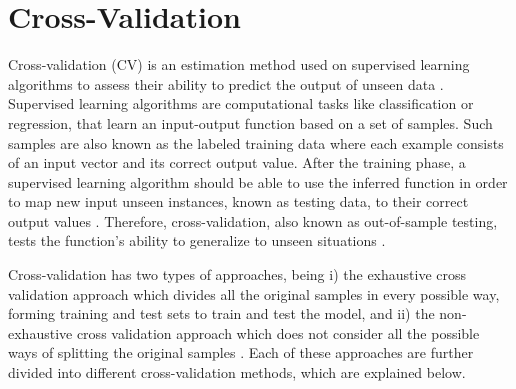 \chapter{Cross-Validation}
\label{ch:cross-validation}

Cross-validation (CV) is an estimation method used on supervised learning algorithms to assess their ability to predict the output of unseen data \cite{kohavi1995study}. Supervised learning algorithms are computational tasks like classification or regression, that learn an input-output function based on a set of samples. Such samples are also known as the labeled training data where each example consists of an input vector and its correct output value. After the training phase, a supervised learning algorithm should be able to use the inferred function in order to map new input unseen instances, known as testing data, to their correct output values \cite{caruana2006empirical}. Therefore, cross-validation, also known as out-of-sample testing, tests the function's ability to generalize to unseen situations \cite{kohavi1995study}.

Cross-validation has two types of approaches, being i) the exhaustive cross validation approach which divides all the original samples in every possible way, forming training and test sets to train and test the model, and ii) the non-exhaustive cross validation approach which does not consider all the possible ways of splitting the original samples \cite{arlot2010survey}. Each of these approaches are further divided into different cross-validation methods, which are explained below.

